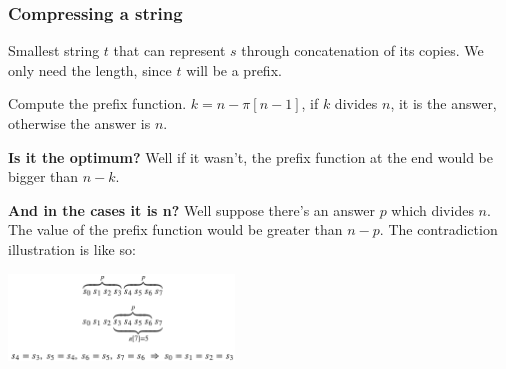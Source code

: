 \documentclass{IEEEtran}
\begin{document}
      \subsubsection{Compressing a string}
        Smallest string $t$ that can represent $s$ through concatenation of its copies. We only need the length, since $t$ will be a prefix.\par 
        Compute the prefix function. $k = n-\pi[n-1]$, if $k$ divides $n$, it is the answer, otherwise the answer is $n$.\par 
        \textbf{Is it the optimum?} Well if it wasn't, the prefix function at the end would be bigger than $n-k$.\par 
        \textbf{And in the cases it is n?} Well suppose there's an answer $p$ which divides $n$. The value of the prefix function would be greater than $n-p$. The contradiction illustration is like so:
        \begin{center}
          \includegraphics[width=0.45\textwidth]{stringCompressionContradiction.png}
        \end{center}
\end{document}
